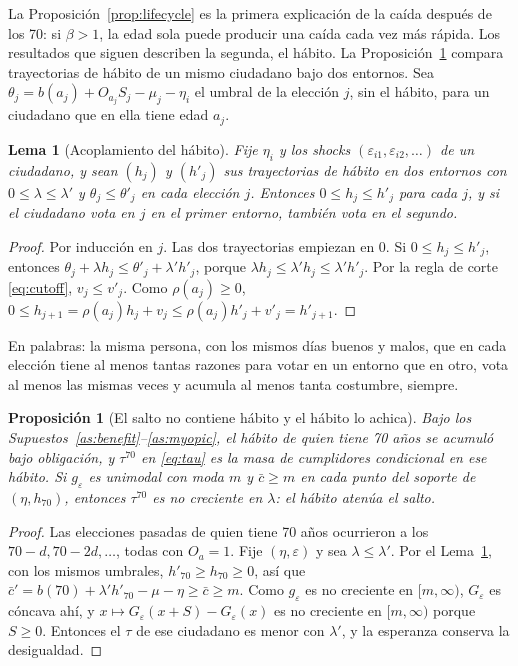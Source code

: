 \documentclass[11pt]{article}
\newtheorem{proposition}{Proposición}
\newtheorem{lemma}{Lema}
\theoremstyle{definition}
\newcommand{\1}{\mathbbm{1}}
\begin{document}
La Proposición~\ref{prop:lifecycle} es la primera explicación de la caída después de los 70: si
$\beta>1$, la edad sola puede producir una caída cada vez más rápida. Los resultados que siguen
describen la segunda, el hábito. La Proposición~\ref{prop:jump} compara trayectorias de hábito de
un mismo ciudadano bajo dos entornos. Sea $\theta_j=b(a_j)+O_{a_j}S_j-\mu_j-\eta_i$ el umbral de la
elección $j$, sin el hábito, para un ciudadano que en ella tiene edad $a_j$.

\begin{lemma}[Acoplamiento del hábito]\label{lem:coupling}
Fije $\eta_i$ y los shocks $(\varepsilon_{i1},\varepsilon_{i2},\dots)$ de un ciudadano, y sean
$(h_j)$ y $(h'_j)$ sus trayectorias de hábito en dos entornos con $0\le\lambda\le\lambda'$ y
$\theta_j\le\theta'_j$ en cada elección $j$. Entonces $0\le h_j\le h'_j$ para cada $j$, y si el
ciudadano vota en $j$ en el primer entorno, también vota en el segundo.
\end{lemma}

\begin{proof}
Por inducción en $j$. Las dos trayectorias empiezan en $0$. Si $0\le h_j\le h'_j$, entonces
$\theta_j+\lambda h_j\le\theta'_j+\lambda'h'_j$, porque $\lambda h_j\le\lambda'h_j\le\lambda'h'_j$.
Por la regla de corte \eqref{eq:cutoff}, $v_j\le v'_j$. Como $\rho(a_j)\ge0$,
$0\le h_{j+1}=\rho(a_j)h_j+v_j\le\rho(a_j)h'_j+v'_j=h'_{j+1}$.
\end{proof}

En palabras: la misma persona, con los mismos días buenos y malos, que en cada elección tiene al
menos tantas razones para votar en un entorno que en otro, vota al menos las mismas veces y acumula
al menos tanta costumbre, siempre.

\begin{proposition}[El salto no contiene hábito y el hábito lo achica]\label{prop:jump}
Bajo los Supuestos~\ref{as:benefit}--\ref{as:myopic}, el hábito de quien tiene 70 años se acumuló
bajo obligación, y $\tau^{70}$ en \eqref{eq:tau} es la masa de cumplidores condicional en ese
hábito. Si $g_\varepsilon$ es unimodal con moda $m$ y $\bar c\ge m$ en cada punto del soporte de
$(\eta,h_{70})$, entonces $\tau^{70}$ es no creciente en $\lambda$: el hábito atenúa el salto.
\end{proposition}

\begin{proof}
Las elecciones pasadas de quien tiene 70 años ocurrieron a los $70-d,70-2d,\dots$, todas con
$O_a=1$. Fije $(\eta,\varepsilon)$ y sea $\lambda\le\lambda'$. Por el Lema~\ref{lem:coupling},
con los mismos umbrales, $h'_{70}\ge h_{70}\ge0$, así que
$\bar c'=b(70)+\lambda'h'_{70}-\mu-\eta\ge\bar c\ge m$. Como $g_\varepsilon$ es no creciente en
$[m,\infty)$, $G_\varepsilon$ es cóncava ahí, y $x\mapsto G_\varepsilon(x+S)-G_\varepsilon(x)$ es no
creciente en $[m,\infty)$ porque $S\ge0$. Entonces el $\tau$ de ese ciudadano es menor con
$\lambda'$, y la esperanza conserva la desigualdad.
\end{proof}
\end{document}
